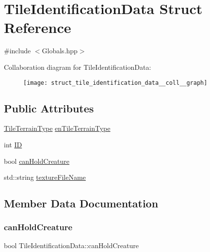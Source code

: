 \hypertarget{struct_tile_identification_data}{}\section{Tile\+Identification\+Data Struct Reference}
\label{struct_tile_identification_data}


{\ttfamily \#include $<$Globals.\+hpp$>$}



Collaboration diagram for Tile\+Identification\+Data\+:
\nopagebreak
\begin{figure}[H]
\begin{center}
\leavevmode
\texttt{[image: struct\_tile\_identification\_data\_\_coll\_\_graph]}
\end{center}
\end{figure}
\subsection*{Public Attributes}
\begin{DoxyCompactItemize}
\item 
\mbox{\hyperlink{_enum_types_8hpp_a462b3f8c270b48544fc9c2e167a3f6e5}{Tile\+Terrain\+Type}} \mbox{\hyperlink{struct_tile_identification_data_a966505adf98464160d947a95818a8d36}{en\+Tile\+Terrain\+Type}}
\item 
int \mbox{\hyperlink{struct_tile_identification_data_af8dc97a27969926817e80d13d3d6c7b9}{ID}}
\item 
bool \mbox{\hyperlink{struct_tile_identification_data_abcd7c3d9a113b5108a51b6e25527d630}{can\+Hold\+Creature}}
\item 
std\+::string \mbox{\hyperlink{struct_tile_identification_data_a4b60c03f60c758ffabdcfd90c183d2b3}{texture\+File\+Name}}
\end{DoxyCompactItemize}


\subsection{Member Data Documentation}
\mbox{\label{struct_tile_identification_data_abcd7c3d9a113b5108a51b6e25527d630}} 
\subsubsection{\texorpdfstring{can\+Hold\+Creature}{canHoldCreature}}
{\footnotesize\ttfamily bool Tile\+Identification\+Data\+::can\+Hold\+Creature}

